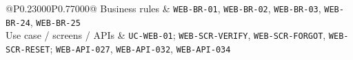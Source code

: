 \begin{longtable}{@{}P{0.23000\SRSWidth}P{0.77000\SRSWidth}@{}}
Business rules & \texttt{WEB-\allowbreak{}BR-\allowbreak{}01}, \texttt{WEB-\allowbreak{}BR-\allowbreak{}02}, \texttt{WEB-\allowbreak{}BR-\allowbreak{}03}, \texttt{WEB-\allowbreak{}BR-\allowbreak{}24}, \texttt{WEB-\allowbreak{}BR-\allowbreak{}25} \\[3pt]
Use case /\allowbreak{} screens /\allowbreak{} APIs & \texttt{UC-\allowbreak{}WEB-\allowbreak{}01}; \texttt{WEB-\allowbreak{}SCR-\allowbreak{}VERIFY}, \texttt{WEB-\allowbreak{}SCR-\allowbreak{}FORGOT}, \texttt{WEB-\allowbreak{}SCR-\allowbreak{}RESET}; \texttt{WEB-\allowbreak{}API-\allowbreak{}027}, \texttt{WEB-\allowbreak{}API-\allowbreak{}032}, \texttt{WEB-\allowbreak{}API-\allowbreak{}034} \\[3pt]
\end{longtable}
\endgroup

